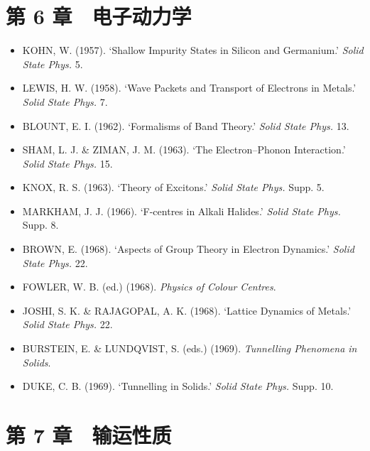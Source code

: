 \section*{第 6 章　电子动力学}

\begin{itemize}[leftmargin=2em, itemsep=0.2em]
\item KOHN, W. (1957). `Shallow Impurity States in Silicon and Germanium.' \emph{Solid State Phys.} 5.
\item LEWIS, H. W. (1958). `Wave Packets and Transport of Electrons in Metals.' \emph{Solid State Phys.} 7.
\item BLOUNT, E. I. (1962). `Formalisms of Band Theory.' \emph{Solid State Phys.} 13.
\item SHAM, L. J. \& ZIMAN, J. M. (1963). `The Electron--Phonon Interaction.' \emph{Solid State Phys.} 15.
\item KNOX, R. S. (1963). `Theory of Excitons.' \emph{Solid State Phys.} Supp. 5.
\item MARKHAM, J. J. (1966). `F-centres in Alkali Halides.' \emph{Solid State Phys.} Supp. 8.
\item BROWN, E. (1968). `Aspects of Group Theory in Electron Dynamics.' \emph{Solid State Phys.} 22.
\item FOWLER, W. B. (ed.) (1968). \emph{Physics of Colour Centres}.
\item JOSHI, S. K. \& RAJAGOPAL, A. K. (1968). `Lattice Dynamics of Metals.' \emph{Solid State Phys.} 22.
\item BURSTEIN, E. \& LUNDQVIST, S. (eds.) (1969). \emph{Tunnelling Phenomena in Solids}.
\item DUKE, C. B. (1969). `Tunnelling in Solids.' \emph{Solid State Phys.} Supp. 10.
\end{itemize}

\section*{第 7 章　输运性质}

